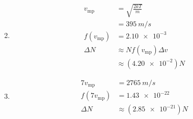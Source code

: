 \documentclass{article}
\begin{document}
\setcounter{subsubsection}{74}
\subsubsection{}

\begin{enumerate}
  \setcounter{enumi}{1}
  \item

        \begin{align*}
          v_\text{mp}    & = \sqrt{\frac{2 k T}{m}}          \\
                         & = \qty{395}{m/s}                  \\
          f(v_\text{mp}) & = \num{2.10e-3}                   \\
          \Delta N       & \approx N f(v_\text{mp}) \Delta v \\
                         & \approx (\num{4.20e-2}) N
        \end{align*}

  \item

        \begin{align*}
          7 v_\text{mp}    & = \qty{2765}{m/s}          \\
          f(7 v_\text{mp}) & = \num{1.43e-22}           \\
          \Delta N         & \approx (\num{2.85e-21}) N
        \end{align*}
\end{enumerate}

\setcounter{subsubsection}{76}
\subsubsection{}
\end{document}
